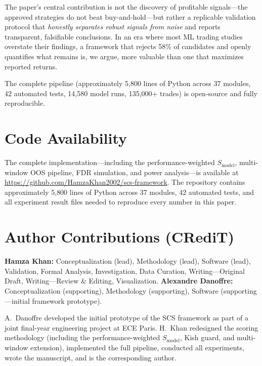 \documentclass[12pt,a4paper]{article}
\begin{document}
The paper's central contribution is not the discovery of profitable signals---the approved strategies do not beat buy-and-hold---but rather a replicable validation protocol that \emph{honestly separates robust signals from noise} and reports transparent, falsifiable conclusions. In an era where most ML trading studies overstate their findings, a framework that rejects 58\% of candidates and openly quantifies what remains is, we argue, more valuable than one that maximizes reported returns.

The complete pipeline (approximately 5{,}800 lines of Python across 37 modules, 42 automated tests, 14,580 model runs, 135,000+ trades) is open-source and fully reproducible.


\section*{Code Availability}

The complete implementation---including the performance-weighted $S_{\text{model}}$, multi-window OOS pipeline, FDR simulation, and power analysis---is available at \url{https://github.com/HamzaKhan2002/scs-framework}. The repository contains approximately 5{,}800 lines of Python across 37 modules, 42 automated tests, and all experiment result files needed to reproduce every number in this paper.


\section*{Author Contributions (CRediT)}

\textbf{Hamza Khan:} Conceptualization (lead), Methodology (lead), Software (lead), Validation, Formal Analysis, Investigation, Data Curation, Writing---Original Draft, Writing---Review \& Editing, Visualization.
\textbf{Alexandre Danoffre:} Conceptualization (supporting), Methodology (supporting), Software (supporting---initial framework prototype).

A.~Danoffre developed the initial prototype of the SCS framework as part of a joint final-year engineering project at ECE Paris. H.~Khan redesigned the scoring methodology (including the performance-weighted $S_{\text{model}}$, Kish guard, and multi-window extension), implemented the full pipeline, conducted all experiments, wrote the manuscript, and is the corresponding author.
\end{document}
